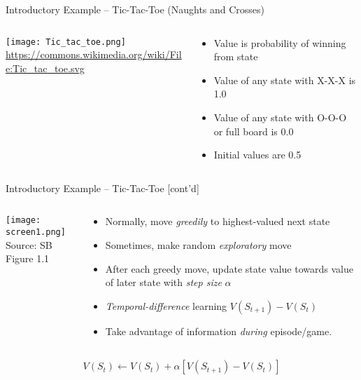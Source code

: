 \documentclass[ignorenonframetext,xcolor=x11names]{beamer}
\begin{document}
\begin{frame}{Introductory Example -- Tic-Tac-Toe \small(Naughts and Crosses)}
\begin{columns}
\begin{column}{0.25\textwidth}
\texttt{[image: Tic\_tac\_toe.png]} \\
\vspace{\baselineskip}
\scriptsize \url{https://commons.wikimedia.org/wiki/File:Tic_tac_toe.svg}
\end{column}
\begin{column}{0.75\textwidth}
\begin{itemize}
  \item Value is probability of winning from state
  \item Value of any state with X-X-X is 1.0
  \item Value of any state with O-O-O or full board is 0.0
  \item Initial values are 0.5
\end{itemize}
\end{column}
\end{columns}
\end{frame}

\begin{frame}{Introductory Example -- Tic-Tac-Toe \small [cont'd]}
\begin{columns}
\begin{column}{0.5\textwidth}
\texttt{[image: screen1.png]} \\
\centering
\scriptsize Source: SB Figure 1.1
\end{column}
\begin{column}{0.5\textwidth}
\begin{itemize}
  \item Normally, move \emph{greedily} to highest-valued next state
  \item Sometimes, make random \emph{exploratory} move
  \item After each greedy move, update state value towards value of later state with \emph{step size} $\alpha$
  \item \emph{Temporal-difference} learning $V(S_{t+1}) - V(S_t)$
  \item Take advantage of information \emph{during} episode/game.
\end{itemize}
\end{column}
\end{columns}
  \begin{align*}
  V(S_t) \leftarrow V(S_t) + \alpha \left[ V(S_{t+1}) - V(S_t)\right] 
  \end{align*}
\end{frame}
\end{document}
